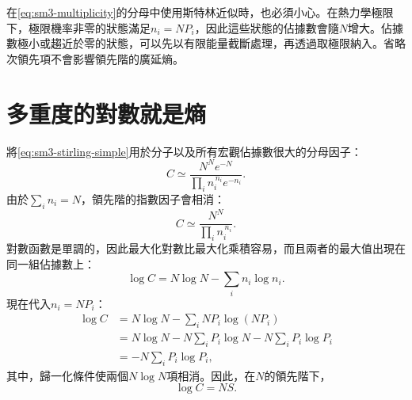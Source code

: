 \begin{classroomqa}\end{classroomqa}

\begin{classroomqa}\end{classroomqa}

在\eqref{eq:sm3-multiplicity}的分母中使用斯特林近似時，也必須小心。在熱力學極限下，極限機率非零的狀態滿足\(n_i=NP_i\)，因此這些狀態的佔據數會隨\(N\)增大。佔據數極小或趨近於零的狀態，可以先以有限能量截斷處理，再透過取極限納入。省略次領先項不會影響領先階的廣延熵。

\section{多重度的對數就是熵}

將\eqref{eq:sm3-stirling-simple}用於分子以及所有宏觀佔據數很大的分母因子：\begin{equation}
 C\simeq
 \frac{N^Ne^{-N}}
 {\prod_i n_i^{\,n_i}e^{-n_i}}.
 \label{eq:sm3-c-stirling}
\end{equation}由於\(\sum_i n_i=N\)，領先階的指數因子會相消：\begin{equation}
 C\simeq\frac{N^N}{\prod_i n_i^{\,n_i}}.
 \label{eq:sm3-c-leading}
\end{equation}對數函數是單調的，因此最大化對數比最大化乘積容易，而且兩者的最大值出現在同一組佔據數上：\begin{equation}
 \log C=N\log N-\sum_i n_i\log n_i.
 \label{eq:sm3-logc-occupations}
\end{equation}現在代入\(n_i=NP_i\)：\begin{align}
 \log C
 &=N\log N-\sum_iNP_i\log(NP_i)\\
 &=N\log N-N\sum_iP_i\log N
   -N\sum_iP_i\log P_i\\
 &=-N\sum_iP_i\log P_i,
 \label{eq:sm3-logc-entropy-derivation}
\end{align}其中，歸一化條件使兩個\(N\log N\)項相消。因此，在\(N\)的領先階下，\begin{equation}
 \boxed{\log C=NS}.
 \label{eq:sm3-logc-ns}
\end{equation}


